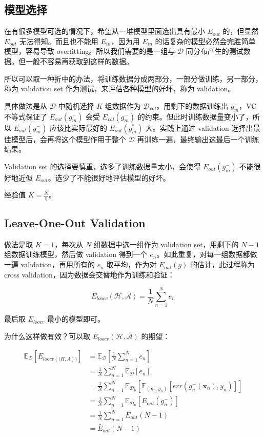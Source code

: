 \documentclass[a4paper]{article}
\begin{document}
\subsection{模型选择}
在有很多模型可选的情况下，希望从一堆模型里面选出具有最小 $E_{out}$ 的，但显然 $E_{out}$ 无法得知。而且也不能用 $E_{in}$，因为用 $E_{in}$ 的话复杂的模型必然会完胜简单模型，容易导致 overfitting。所以我们需要的是一组与 $\mathcal{D}$ 同分布产生的测试数据。但一般不容易再获取到这样的数据。

所以可以取一种折中的办法，将训练数据分成两部分，一部分做训练，另一部分，称为 validation set 作为测试，来评估各种模型的好坏，称为 validation。

具体做法是从 $\mathcal{D}$ 中随机选择 $K$ 组数据作为 $\mathcal{D}_{val}$。用剩下的数据训练出 $g_m^{-}$，VC 不等式保证了 $E_{out}(g_m^{-})$ 会受 $E_{val}(g_m^{-})$ 的约束。但此时训练数据量变小了，所以 $E_{out}(g_m^{-})$ 应该比实际最好的 $E_{out}(g_m^{*})$ 大。实践上通过 validation 选择出最佳模型后，会再将这个模型作用于整个 $\mathcal{D}$ 再训练一遍，最终输出这最后一个训练结果。

Validation set 的选择要慎重，选多了训练数据量太小，会使得 $E_{out}(g_m^{-})$ 不能很好地近似 $E_{out}$。选少了不能很好地评估模型的好坏。


经验值 $\displaystyle K = \frac{N}{5}$。


\subsection{Leave-One-Out Validation}
做法是取 $K=1$，每次从 $N$ 组数据中选一组作为 validation set，用剩下的 $N-1$ 组数据训练模型，然后做 validation 得到一个 $e_n$。如此重复，对每一组数据都做一遍 validation，再用所有的 $e_n$
取平均，作为对 $E_{out}(g)$ 的估计，此过程称为 cross validation，因为数据会交替地作为训练和验证：

$$E_{loocv}(\mathcal{H}, \mathcal{A}) = \frac{1}{N}\sum_{n=1}^{N}e_n$$

最后取 $E_{loocv}$ 最小的模型即可。

为什么这样做有效？可以取 $E_{loocv}(\mathcal{H, A})$ 的期望：

\begin{equation}
\begin{aligned}
\mathbb{E}_{\mathcal{D}}[E_{loocv(\mathcal(H, A))}] &= \mathbb{E}_{\mathcal{D}}[\frac{1}{N}\sum_{n=1}^{N}e_n] \\
&= \frac{1}{N}\sum_{n=1}^{N}\mathbb{E}_{\mathcal{D}}[e_n] \\
&= \frac{1}{N}\sum_{n=1}^{N}\mathbb{E}_{\mathcal{D}_n}[\mathbb{E}_{(\mathbf{x}_n,y_n)}[err(g_n^{-}(\mathbf{x}_n), y_n)]] \\
&= \frac{1}{N}\sum_{n=1}^{N}\mathbb{E}_{\mathcal{D}_n}[E_{out}(g_n^{-})] \\
&= \frac{1}{N}\sum_{n=1}^{N}\bar{E}_{out}(N - 1) \\
&= \bar{E}_{out}(N - 1)
\end{aligned}
\end{equation}
\end{document}
